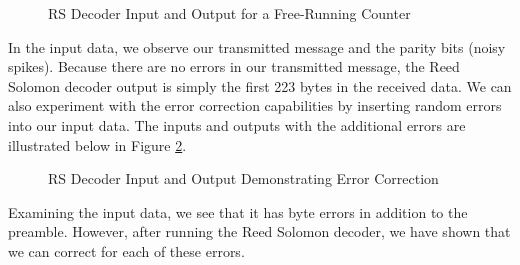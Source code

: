 \documentclass[conference,onecolumn]{IEEEtran}
\begin{document}
\begin{figure}[H]
	\centerline{}
	\caption{RS Decoder Input and Output for a Free-Running Counter}
	\label{fig::RS_decoder_output}
\end{figure}

In the input data, we observe our transmitted message and the parity bits (noisy spikes). Because there are no errors in our transmitted message, the Reed Solomon decoder output is simply the first 223 bytes in the received data. We can also experiment with the error correction capabilities by inserting random errors into our input data. The inputs and outputs with the additional errors are illustrated below in Figure \ref{fig::RS_decoder_output_errors}.

\begin{figure}[H]
	\centerline{}
	\caption{RS Decoder Input and Output Demonstrating Error Correction}
	\label{fig::RS_decoder_output_errors}
\end{figure}

Examining the input data, we see that it has byte errors in addition to the preamble. However, after running the Reed Solomon decoder, we have shown that we can correct for each of these errors.
\end{document}
